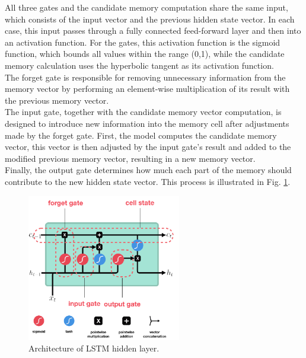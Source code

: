 All three gates and the candidate memory computation share the same input, which consists of the input vector and the previous hidden state vector. In each case, this input passes through a fully connected feed-forward layer and then into an activation function. For the gates, this activation function is the sigmoid function, which bounds all values within the range (0,1), while the candidate memory calculation uses the hyperbolic tangent as its activation function.
\\

The forget gate is responsible for removing unnecessary information from the memory vector by performing an element-wise multiplication of its result with the previous memory vector.
\\

The input gate, together with the candidate memory vector computation, is designed to introduce new information into the memory cell after adjustments made by the forget gate. First, the model computes the candidate memory vector, this vector is then adjusted by the input gate's result and added to the modified previous memory vector, resulting in a new memory vector.
\\

Finally, the output gate determines how much each part of the memory should contribute to the new hidden state vector. This process is illustrated in Fig. \ref{fig:lstm_arch}.

\begin{figure}[!h]
	\centering
	
	\includegraphics[width=0.6\textwidth]{images/LSTM_arch.png}
	
	\caption{Architecture of LSTM hidden layer.}
	\label{fig:lstm_arch}
\end{figure}
\newpage

